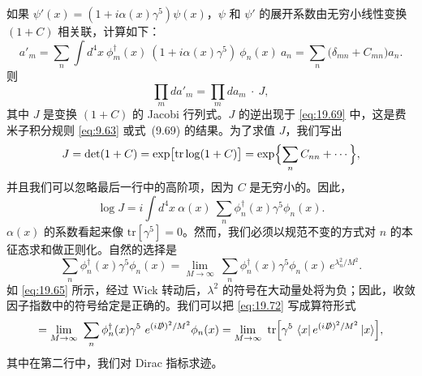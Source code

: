如果 $\psi'(x) = (1+i\alpha(x)\gamma^5)\psi(x)$，$\psi$ 和 $\psi'$ 的展开系数由无穷小线性变换 $(1+C)$ 相关联，计算如下：
\begin{equation}
  a'_m = \sum_n \int d^4x\ \phi^{\dagger}_m(x)\ (1+i\alpha(x)\gamma^5)\
    \phi_n(x)\ a_n = \sum_n \bigl( \delta_{mn} + C_{mn} \bigr)a_n .
  \label{eq:19.68}
\end{equation}
则
\begin{equation}
  \prod_m da'_m = \prod_m da_m\ \cdot\ J ,
  \label{eq:19.69}
\end{equation}
其中 $J$ 是变换 $(1+C)$ 的 Jacobi 行列式。$J$ 的逆出现于 \eqref{eq:19.69} 中，这是费米子积分规则 \eqref{eq:9.63} 或式~(9.69) 的结果。为了求值 $J$，我们写出
\begin{equation}
  J = \det(1+C) = \exp\bigl[ \mathrm{tr}\log(1+C) \bigr]
  = \exp\Bigl\{ \sum_n C_{nn} + \cdots \Bigr\} ,
  \label{eq:19.70}
\end{equation}
并且我们可以忽略最后一行中的高阶项，因为 $C$ 是无穷小的。因此，
\begin{equation}
  \log J = i\int d^4x\ \alpha(x)\ \sum_n \phi^{\dagger}_n(x)\gamma^5\phi_n(x)
  .
  \label{eq:19.71}
\end{equation}
$\alpha(x)$ 的系数看起来像 $\mathrm{tr}[\gamma^5] = 0$。然而，我们必须以规范不变的方式对 $n$ 的本征态求和做正则化。自然的选择是
\begin{equation}
  \sum_n \phi^{\dagger}_n(x)\gamma^5\phi_n(x)
  = \lim_{M\to\infty}\ \sum_n \phi^{\dagger}_n(x)\gamma^5\phi_n(x)\,
    e^{\lambda_n^2/M^2} .
  \label{eq:19.72}
\end{equation}
如 \eqref{eq:19.65} 所示，经过 Wick 转动后，$\lambda^2$ 的符号在大动量处将为负；因此，收敛因子指数中的符号给定是正确的。我们可以把 \eqref{eq:19.72} 写成算符形式
\begin{equation}
  = \lim_{M\to\infty}\ \sum_n \phi^{\dagger}_n(x)\gamma^5\
    e^{(i\slashed{D})^2/M^2}\phi_n(x)
  = \lim_{M\to\infty}\ \mathrm{tr}\Bigl[ \gamma^5\ \langle x|\,
    e^{(i\slashed{D})^2/M^2}\,|x\rangle \Bigr] ,
  \label{eq:19.73}
\end{equation}
其中在第二行中，我们对 Dirac 指标求迹。

